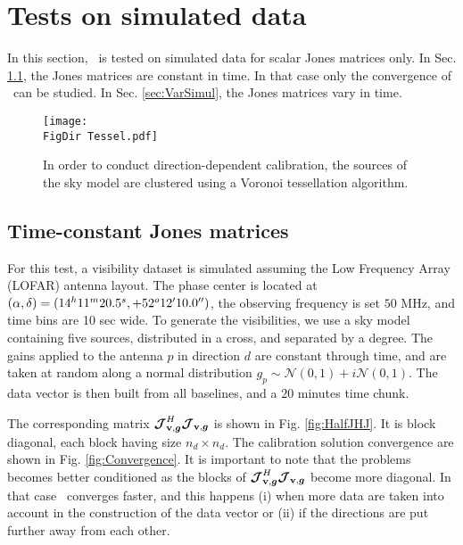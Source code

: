 

\section{Tests on simulated data}

In this section, \COH~is tested on simulated data for scalar Jones
matrices only. In Sec. \ref{sec:SimpleSimul}, the
Jones matrices are constant in time. In that case only the convergence
of \COH~can be studied. In Sec. \ref{sec:VarSimul}, the Jones matrices vary in
time.

\begin{figure}[h!]
\begin{center}
\texttt{[image: \\FigDir Tessel.pdf]}
\caption{\label{fig:tessel} In order to conduct direction-dependent
  calibration, the sources of the sky model are clustered using a Voronoi
  tessellation algorithm.}
\end{center}
\end{figure}

\subsection{Time-constant Jones matrices}
\label{sec:SimpleSimul}

For this test, a visibility dataset is simulated assuming the Low Frequency Array (LOFAR) antenna
layout. The phase center is located at
$(\alpha,\delta)=(14^h11^m20.5^s, +52^{o}12\hbox{$^\prime$}10.0\hbox{$^{\prime\prime}$})$,
the observing frequency is set $50$ MHz, and time
bins are 10 sec wide. To generate the visibilities, we use a sky model containing five
sources, distributed in a cross, and separated by a degree. The gains
applied to the antenna $p$ in direction $d$ are
constant through time, and are taken at random along a normal distribution
$g_{p}\sim\mathcal{N}\left(0,1\right)+i\mathcal{N}\left(0,1\right)$. The
data vector is then built from all baselines, and a $20$ minutes time chunk.

The corresponding matrix $\bm{\mathcal{J}}_{\textbf{v},\bm{g}}^H\bm{\mathcal{J}}_{\textbf{v},\bm{g}}$ is shown in
Fig. \ref{fig:HalfJHJ}. It is block diagonal, each block having size
$n_d\times n_d$. The calibration solution convergence are shown
in Fig. \ref{fig:Convergence}. It is important to note that the
problems becomes better conditioned as the blocks of $\bm{\mathcal{J}}_{\textbf{v},\bm{g}}^H\bm{\mathcal{J}}_{\textbf{v},\bm{g}}$
become more diagonal. In that case \COH~converges faster, and this happens (i) when more data are taken into
account in the construction of the data vector or (ii) if the
directions are put further away from each other.

